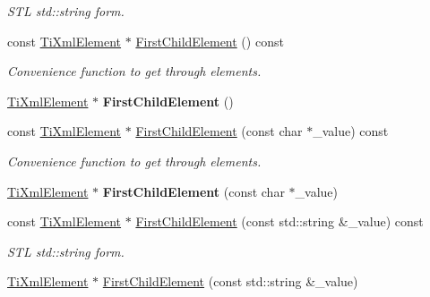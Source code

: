 \begin{DoxyCompactItemize}
\begin{DoxyCompactList}\small\item\em S\+TL std\+::string form. \end{DoxyCompactList}\item 
const \hyperlink{class_ti_xml_element}{Ti\+Xml\+Element} $\ast$ \hyperlink{class_ti_xml_node_ab1f8d8e70d88aea4c5efedfe00862d55}{First\+Child\+Element} () const \hypertarget{class_ti_xml_node_ab1f8d8e70d88aea4c5efedfe00862d55}{}\label{class_ti_xml_node_ab1f8d8e70d88aea4c5efedfe00862d55}

\begin{DoxyCompactList}\small\item\em Convenience function to get through elements. \end{DoxyCompactList}\item 
\hyperlink{class_ti_xml_element}{Ti\+Xml\+Element} $\ast$ {\bfseries First\+Child\+Element} ()\hypertarget{class_ti_xml_node_aa0fecff1f3866ab33a8a25506e95db1d}{}\label{class_ti_xml_node_aa0fecff1f3866ab33a8a25506e95db1d}

\item 
const \hyperlink{class_ti_xml_element}{Ti\+Xml\+Element} $\ast$ \hyperlink{class_ti_xml_node_a0ec361bfef1cf1978d060295f597e0d9}{First\+Child\+Element} (const char $\ast$\+\_\+value) const \hypertarget{class_ti_xml_node_a0ec361bfef1cf1978d060295f597e0d9}{}\label{class_ti_xml_node_a0ec361bfef1cf1978d060295f597e0d9}

\begin{DoxyCompactList}\small\item\em Convenience function to get through elements. \end{DoxyCompactList}\item 
\hyperlink{class_ti_xml_element}{Ti\+Xml\+Element} $\ast$ {\bfseries First\+Child\+Element} (const char $\ast$\+\_\+value)\hypertarget{class_ti_xml_node_a6936ae323675071808ac4840379e57f5}{}\label{class_ti_xml_node_a6936ae323675071808ac4840379e57f5}

\item 
const \hyperlink{class_ti_xml_element}{Ti\+Xml\+Element} $\ast$ \hyperlink{class_ti_xml_node_a327ad4bbd90073c5dfc931b07314f5f7}{First\+Child\+Element} (const std\+::string \&\+\_\+value) const \hypertarget{class_ti_xml_node_a327ad4bbd90073c5dfc931b07314f5f7}{}\label{class_ti_xml_node_a327ad4bbd90073c5dfc931b07314f5f7}

\begin{DoxyCompactList}\small\item\em S\+TL std\+::string form. \end{DoxyCompactList}\item 
\hyperlink{class_ti_xml_element}{Ti\+Xml\+Element} $\ast$ \hyperlink{class_ti_xml_node_a7f1d7291880534c1e5cdeb392d8c1f45}{First\+Child\+Element} (const std\+::string \&\+\_\+value)\hypertarget{class_ti_xml_node_a7f1d7291880534c1e5cdeb392d8c1f45}{}\label{class_ti_xml_node_a7f1d7291880534c1e5cdeb392d8c1f45}


\end{DoxyCompactItemize}
